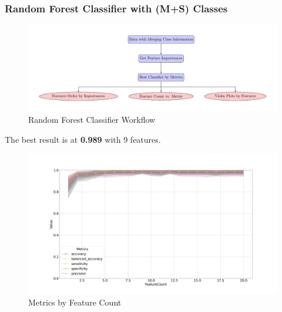 \documentclass{beamer}
\begin{document}
    \begin{frame}[allowframebreaks]
        \frametitle{Random Forest Classifier with (M+S) Classes}

        \begin{figure}
            \includegraphics[width=0.8 \linewidth]{figures/RandomForest/merge.pdf}
            \caption{Random Forest Classifier Workflow}
        \end{figure}

        The best result is at \textbf{0.989} with 9 features.

        \begin{figure}
            \includegraphics[width=0.8 \linewidth]{figures/RandomForest/two.DADA2.homd/metrics.png}
            \caption{Metrics by Feature Count}
        \end{figure}


\end{frame}
\end{document}
